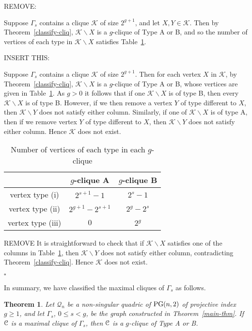 \documentclass[12pt]{article}
\newtheorem{theorem}{Theorem}[section]
\newenvironment{proof}{\noindent{\bf Proof}\hspace{0.5em}}
    { \null  \hfill $\square$ \par}
\newcommand\C{{\cal C}}
\newcommand{\K}{\mathcal K}
\newcommand{\Q}{\mathscr Q}
\renewcommand\setminus{\backslash}
\newcommand\PG{{\rm PG}}
\newcommand{\Label}{\label}
\newcommand\red[1]{{\color{red} #1}}
\newcommand\blue[1]{{\color{blue} #1}}
\begin{document}
\begin{proof} \blue{REMOVE:

Suppose $\Gamma_s$ contains a clique $\K$ of size $2^{g+1}$, and let $X,Y\in\K$.  Then by Theorem~\ref{classify-cliq}, $\K\setminus X$ is a $g$-clique of Type A or B, and so the number of vertices of each type in $\K\setminus X$ satisfies Table~\ref{table-types}.

}

\red{INSERT THIS:

Suppose $\Gamma_s$ contains a clique $\K$ of size $2^{g+1}$.  Then for each vertex $X$ in $\K$, 
by Theorem~\ref{classify-cliq}, $\K\setminus X$ is a $g$-clique of Type A or B, whose vertices are given in Table~\ref{table-types}. As $g>0$ it follows that if one $\K\setminus X$ is of type B, then every  $\K\setminus X$ is of type B. However, if we then remove a vertex $Y$ of type different to $X$, then $\K\setminus Y$ does not satisfy either column.  Similarly, if one of $\K\setminus X$ is of type A, then if we remove  vertex $Y$ of type different to $X$, then $\K\setminus Y$ does not satisfy either column. Hence $\K$ does not exist.
}
\begin{table}[h]\caption{Number of vertices of each type in each $g$-clique}\label{table-types}
\begin{center}
 \begin{tabular}{|c|c|c|}
\hline
&$g$-clique A&$g$-clique B\\
\hline
vertex type (i)&$2^{s+1}-1$&$2^s-1$\\ \hline
vertex type (ii)&$2^{g+1}-2^{s+1}$&$2^g-2^s$\\ \hline
vertex type (iii)&$0$&$2^g$\\ \hline
\end{tabular}\end{center}\end{table}

\blue{REMOVE
It is straightforward to check that if $\K\setminus X$ satisfies one of the columns in Table~\ref{table-types}, then $\K\setminus Y$ does not satisfy either column, contradicting Theorem~\ref{classify-cliq}. Hence $\K$ does not exist.

}
\end{proof}

In summary, we have classified the maximal cliques of $\Gamma_s$ as follows. 

\begin{theorem} \Label{max-cl}
Let $\Q_n$ be a non-singular quadric of $\PG(n,2)$ of projective index $g\geq1$, and let $\Gamma_s$, $0\leq s<g$, be the graph constructed in Theorem~\ref{main-thm}.
If $\C$ is a maximal clique of $\Gamma_s$, then $\C$ is a $g$-clique of Type A or B.
\end{theorem}
\end{document}
